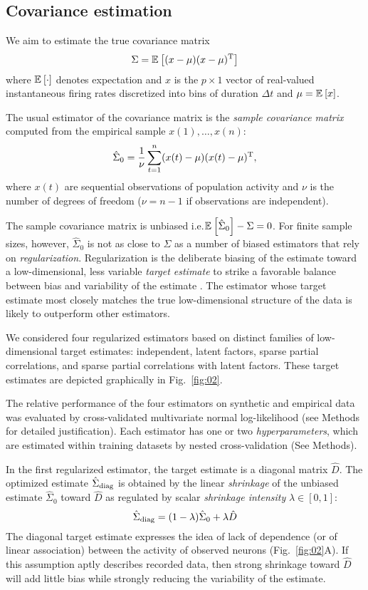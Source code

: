 
\subsection*{Covariance estimation}
We aim to estimate the true covariance matrix 
\begin{equation}
\Sigma = \mathbb E_{}\left[ (x-\mu)(x-\mu)^{\rm T}\right]
\end{equation}
where $\mathbb E_{}\left[ \cdot\right]$ denotes expectation  and $x$ is the $p\times 1$ vector of real-valued instantaneous firing rates discretized into bins of duration $\Delta t$ and $\mu = \mathbb E_{}\left[ x\right]$.  

The usual estimator of the covariance matrix is the \emph{sample covariance matrix} computed from the empirical sample  $x(1),\ldots,x(n)$:
\begin{equation}
\hat \Sigma_0 = \frac 1 \nu \sum\limits_{t=1}^n (x(t)-\mu)(x(t)-\mu)^{\rm T}, 
\end{equation}
where $x(t)$ are sequential observations of population activity and $\nu$ is the number of degrees of freedom ($\nu=n-1$ if observations are independent).

The sample covariance matrix is unbiased i.e.\;$\mathbb E_{}\left[ \hat\Sigma_0\right]-\Sigma=0$.  For finite sample sizes, however, $\hat\Sigma_0$ is not as close to $\Sigma$ as a number of biased estimators that rely on \emph{regularization}. Regularization is the deliberate biasing of the estimate toward a low-dimensional, less variable \emph{target estimate} to strike a favorable balance between bias and variability of the estimate \cite{Bickel:2006,Ledoit:2004}.  The estimator whose target estimate most closely matches the true low-dimensional structure of the data is likely to outperform other estimators.

We considered four regularized estimators based on distinct families of low-dimensional target estimates: independent, latent factors, sparse partial correlations, and sparse partial correlations with latent factors. These target estimates are depicted graphically in Fig.~\ref{fig:02}.  



The relative performance of the four estimators on synthetic and empirical data was evaluated by cross-validated multivariate normal log-likelihood (see Methods for detailed justification).  
Each estimator has one or two \emph{hyperparameters}, which are estimated within training datasets by nested cross-validation (See Methods). 

In the first regularized estimator, the target estimate is a diagonal matrix $\hat D$.  The optimized estimate $\hat\Sigma_{\rm diag}$ is obtained by the linear \emph{shrinkage} of the unbiased estimate $\hat\Sigma_0$ toward $\hat D$ as regulated by scalar \emph{shrinkage intensity} $\lambda \in [0, 1]$:
\begin{equation}
\hat \Sigma_{\rm diag} = (1-\lambda) \hat \Sigma_0 + \lambda \hat D
\end{equation}
The diagonal target estimate expresses the idea of lack of dependence (or of linear association) between the activity of observed neurons (Fig.~\ref{fig:02}A).  If this assumption aptly describes recorded data, then strong shrinkage toward $\hat D$ will add little bias while strongly reducing the variability of the estimate. 

